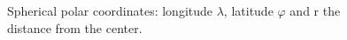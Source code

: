 \begin{figure}
  \begin{center}
  \end{center}
\caption{Spherical polar coordinates: longitude $\lambda$,
latitude $\varphi$ and r the distance from the center.}
\label{fig:spherical-polar-coord}
\end{figure}
